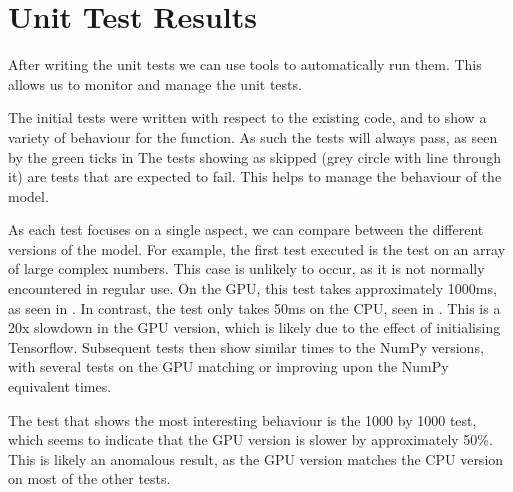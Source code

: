 \section{Unit Test Results}


After writing the unit tests we can use tools to automatically run them.
This allows us to monitor and manage the unit tests.


The initial tests were written with respect to the existing code, and to show a variety of behaviour for the function.
As such the tests will always pass, as seen by the green ticks in 
The tests showing as skipped (grey circle with line through it) are tests that are expected to fail.
This helps to manage the behaviour of the model.


As each test focuses on a single aspect, we can compare between the different versions of the model.
For example, the first test executed is the test on an array of large complex numbers.
This case is unlikely to occur, as it is not normally encountered in regular use.
On the GPU, this test takes approximately 1000ms, as seen in .
In contrast, the test only takes 50ms on the CPU, seen in .
This is a 20x slowdown in the GPU version, which is likely due to the effect of initialising Tensorflow.
Subsequent tests then show similar times to the NumPy versions, with several tests on the GPU matching or improving upon the NumPy equivalent times.

The test that shows the most interesting behaviour is the 1000 by 1000 test, which seems to indicate that the GPU version is slower by approximately 50\%. 
This is likely an anomalous result, as the GPU version matches the CPU version on most of the other    tests.

